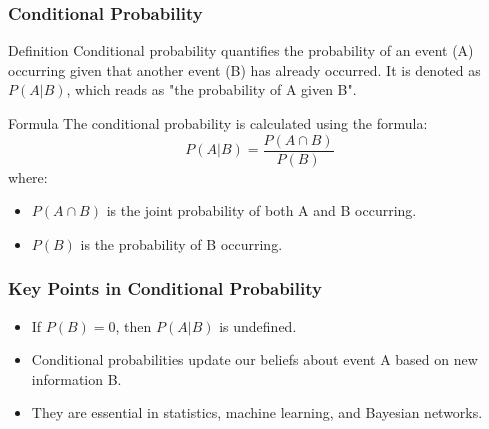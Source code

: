 \documentclass[aspectratio=169]{beamer}
\begin{document}
\begin{frame}[fragile]
  \frametitle{Conditional Probability}
  \begin{block}{Definition}
    Conditional probability quantifies the probability of an event (A) occurring given that another event (B) has already occurred. It is denoted as \( P(A | B) \), which reads as "the probability of A given B".
  \end{block}
  
  \begin{block}{Formula}
    The conditional probability is calculated using the formula:
    \begin{equation}
    P(A | B) = \frac{P(A \cap B)}{P(B)}
    \end{equation}
    where:
    \begin{itemize}
      \item \( P(A \cap B) \) is the joint probability of both A and B occurring.
      \item \( P(B) \) is the probability of B occurring.
    \end{itemize}
  \end{block}
\end{frame}

\begin{frame}[fragile]
  \frametitle{Key Points in Conditional Probability}
  \begin{itemize}
    \item If \( P(B) = 0 \), then \( P(A | B) \) is undefined.
    \item Conditional probabilities update our beliefs about event A based on new information B.
    \item They are essential in statistics, machine learning, and Bayesian networks.
  \end{itemize}
\end{frame}
\end{document}
